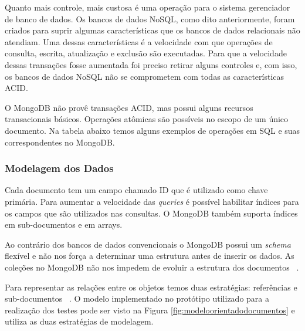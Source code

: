 Quanto mais controle, mais custosa é uma operação para o sistema gerenciador de banco de dados.  Os bancos de dados NoSQL, como dito anteriormente, foram criados para suprir algumas características que os bancos de dados relacionais não atendiam. Uma dessas características é a velocidade com que operações de consulta, escrita, atualização e exclusão são executadas.  Para que a velocidade dessas transações fosse aumentada foi preciso retirar alguns controles e, com isso, os bancos de dados NoSQL não se comprometem com todas as características ACID.

O MongoDB não provê transações ACID, mas possui alguns recursos transacionais básicos. Operações atômicas são possíveis no escopo de um único documento. Na tabela abaixo temos alguns exemplos de operações em SQL e suas correspondentes no MongoDB.

\subsubsection{Modelagem dos Dados}

Cada documento tem um campo chamado ID que é utilizado como chave primária. Para aumentar a velocidade das \textit{queries} é possível habilitar índices para os campos que são utilizados nas consultas. O MongoDB também suporta índices em sub-documentos e em arrays.

Ao contrário dos bancos de dados convencionais o MongoDB possui um \textit{schema} flexível e não nos força a determinar uma estrutura antes de inserir os dados. As coleções no MongoDB não nos impedem de evoluir a estrutura dos documentos ~\cite{Orendanalysisand}.

Para representar as relações entre os objetos temos duas estratégias: referências e sub-documentos ~\cite{Orendanalysisand}. O modelo implementado no protótipo utilizado para a realização dos testes pode ser visto na Figura \ref{fig:modeloorientadodocumentos} e utiliza as duas estratégias de modelagem.

